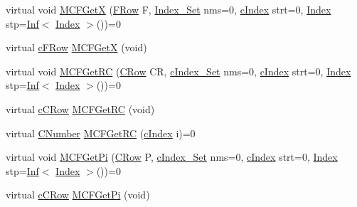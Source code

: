 \begin{DoxyCompactItemize}
\item 
virtual void \mbox{\hyperlink{class_m_c_f_cplex_a884f1180138ddf3df909347b1c85428c}{M\+C\+F\+GetX}} (\mbox{\hyperlink{class_m_c_f_class_a9dae1f1a39c208ce3c2b337cd5bb3d00}{F\+Row}} F, \mbox{\hyperlink{class_m_c_f_class_ace3388eb329ff0551a0b86b6c67e33d8}{Index\+\_\+\+Set}} nms=0, \mbox{\hyperlink{class_m_c_f_class_a76aaabb20535c51a2752b93f6c38fe54}{c\+Index}} strt=0, \mbox{\hyperlink{class_m_c_f_class_ad53d6229d7ec28555a9c9c2fd9abf773}{Index}} stp=\mbox{\hyperlink{class_o_p_ttypes__di__unipi__it_1_1_inf}{Inf}}$<$ \mbox{\hyperlink{class_m_c_f_class_ad53d6229d7ec28555a9c9c2fd9abf773}{Index}} $>$())=0
\item 
virtual \mbox{\hyperlink{class_m_c_f_class_ad325f3193dbba0ddef1da4e72d29eda6}{c\+F\+Row}} \mbox{\hyperlink{class_m_c_f_cplex_a4eb307e0707adaef99bb0e08c9e10eb8}{M\+C\+F\+GetX}} (void)
\item 
virtual void \mbox{\hyperlink{class_m_c_f_cplex_a361d84ae42041fdbf3824d45fc4c54aa}{M\+C\+F\+Get\+RC}} (\mbox{\hyperlink{class_m_c_f_class_a62409402be4e4b301e1a568f99f877be}{C\+Row}} CR, \mbox{\hyperlink{class_m_c_f_class_a81575b2d4e4d5636b17170432150ae69}{c\+Index\+\_\+\+Set}} nms=0, \mbox{\hyperlink{class_m_c_f_class_a76aaabb20535c51a2752b93f6c38fe54}{c\+Index}} strt=0, \mbox{\hyperlink{class_m_c_f_class_ad53d6229d7ec28555a9c9c2fd9abf773}{Index}} stp=\mbox{\hyperlink{class_o_p_ttypes__di__unipi__it_1_1_inf}{Inf}}$<$ \mbox{\hyperlink{class_m_c_f_class_ad53d6229d7ec28555a9c9c2fd9abf773}{Index}} $>$())=0
\item 
virtual \mbox{\hyperlink{class_m_c_f_class_ab700102e9ba8bb6015be6818d4e99097}{c\+C\+Row}} \mbox{\hyperlink{class_m_c_f_cplex_af027cee8179a876a4879c73820c380d1}{M\+C\+F\+Get\+RC}} (void)
\item 
virtual \mbox{\hyperlink{class_m_c_f_class_a24d0627ba8213afe1ec4ebeb4508e8f1}{C\+Number}} \mbox{\hyperlink{class_m_c_f_cplex_a7c103b582c910ccfda354032aae5722e}{M\+C\+F\+Get\+RC}} (\mbox{\hyperlink{class_m_c_f_class_a76aaabb20535c51a2752b93f6c38fe54}{c\+Index}} i)=0
\item 
virtual void \mbox{\hyperlink{class_m_c_f_cplex_a8c573c04800332c86ea31aeb80bbd7b1}{M\+C\+F\+Get\+Pi}} (\mbox{\hyperlink{class_m_c_f_class_a62409402be4e4b301e1a568f99f877be}{C\+Row}} P, \mbox{\hyperlink{class_m_c_f_class_a81575b2d4e4d5636b17170432150ae69}{c\+Index\+\_\+\+Set}} nms=0, \mbox{\hyperlink{class_m_c_f_class_a76aaabb20535c51a2752b93f6c38fe54}{c\+Index}} strt=0, \mbox{\hyperlink{class_m_c_f_class_ad53d6229d7ec28555a9c9c2fd9abf773}{Index}} stp=\mbox{\hyperlink{class_o_p_ttypes__di__unipi__it_1_1_inf}{Inf}}$<$ \mbox{\hyperlink{class_m_c_f_class_ad53d6229d7ec28555a9c9c2fd9abf773}{Index}} $>$())=0
\item 
virtual \mbox{\hyperlink{class_m_c_f_class_ab700102e9ba8bb6015be6818d4e99097}{c\+C\+Row}} \mbox{\hyperlink{class_m_c_f_cplex_a8f1a95d5c707f83ffc6aecba1e7e0e10}{M\+C\+F\+Get\+Pi}} (void)
\end{DoxyCompactItemize}
